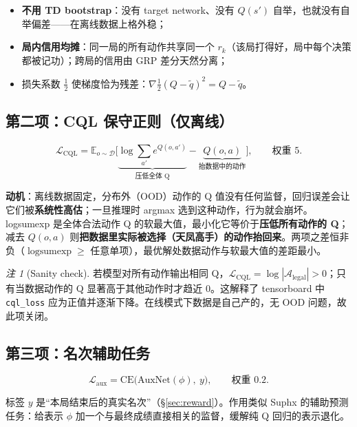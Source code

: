 \documentclass[11pt,a4paper]{ctexart}
\newcommand{\E}{\mathbb{E}}
\DeclareMathOperator{\lse}{logsumexp}
\theoremstyle{remark}
\newtheorem*{rem}{注}
\begin{document}
\begin{itemize}[leftmargin=2em]
  \item \textbf{不用 TD bootstrap}：没有 target network、没有 $Q(s')$ 自举，也就没有自举偏差——在离线数据上格外稳；
  \item \textbf{局内信用均摊}：同一局的所有动作共享同一个 $r_k$（该局打得好，局中每个决策都被记功）；跨局的信用由 GRP 差分天然分离；
  \item 损失系数 $\tfrac{1}{2}$ 使梯度恰为残差：$\nabla \tfrac{1}{2}(Q - \tilde{q})^2 = Q - \tilde{q}$。
\end{itemize}

\subsection{第二项：CQL 保守正则（仅离线）}

\[
\mathcal{L}_{\mathrm{CQL}} = \E_{o \sim \mathcal{D}}\Big[\underbrace{\log \sum_{a'} e^{Q(o, a')}}_{\text{压低全体 Q}} - \underbrace{Q(o, a)}_{\text{抬数据中的动作}}\Big], \qquad \text{权重 } 5.
\]

\textbf{动机}：离线数据固定，分布外（OOD）动作的 Q 值没有任何监督，回归误差会让它们被\textbf{系统性高估}；一旦推理时 argmax 选到这种动作，行为就会崩坏。logsumexp 是全体合法动作 Q 的软最大值，最小化它等价于\textbf{压低所有动作的 Q}；减去 $Q(o,a)$ 则\textbf{把数据里实际被选择（天凤高手）的动作抬回来}。两项之差恒非负（$\lse \ge$ 任意单项），最优解处数据动作与软最大值的差距最小。

\begin{rem}[Sanity check]
若模型对所有动作输出相同 Q，$\mathcal{L}_{\mathrm{CQL}} = \log |\mathcal{A}_{\text{legal}}| > 0$；只有当数据动作的 Q 显著高于其他动作时才趋近 0。这解释了 tensorboard 中 \texttt{cql\_loss} 应为正值并逐渐下降。在线模式下数据是自己产的，无 OOD 问题，故此项关闭。
\end{rem}

\subsection{第三项：名次辅助任务}

\[
\mathcal{L}_{\mathrm{aux}} = \mathrm{CE}\big(\mathrm{AuxNet}(\phi),\ y\big), \qquad \text{权重 } 0.2.
\]

标签 $y$ 是``本局结束后的真实名次''（\S\ref{sec:reward}）。作用类似 Suphx 的辅助预测任务：给表示 $\phi$ 加一个与最终成绩直接相关的监督，缓解纯 Q 回归的表示退化。

\end{document}
